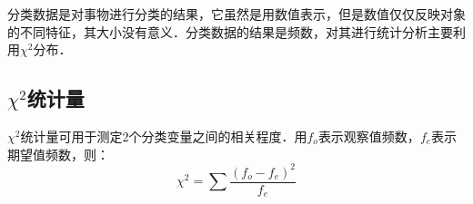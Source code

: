 分类数据是对事物进行分类的结果，它虽然是用数值表示，但是数值仅仅反映对象的不同特征，其大小没有意义．分类数据的结果是频数，对其进行统计分析主要利用$\chi^2$分布．
\subsection{$\chi^2$统计量}
$\chi^2$统计量可用于测定2个分类变量之间的相关程度．用$f_o$表示观察值频数，$f_e$表示期望值频数，则：
\begin{equation}
\chi^2 =  \sum \frac {(f_o-f_e)^2}{f_e}
\end{equation}